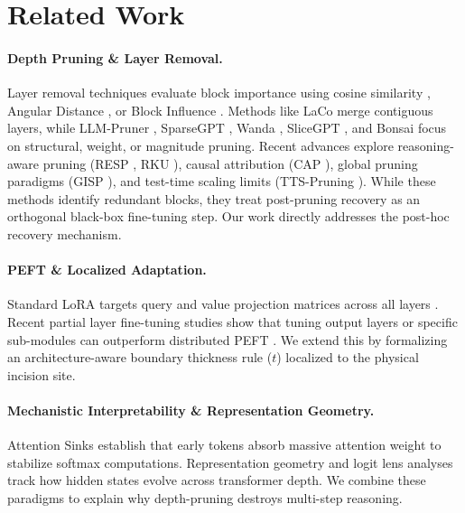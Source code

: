 \documentclass[11pt]{article}
\begin{document}
\section{Related Work}

\paragraph{Depth Pruning \& Layer Removal.} 
Layer removal techniques evaluate block importance using cosine similarity \citep{gromov2024unreasonable}, Angular Distance \citep{siddiqui2024deeper}, or Block Influence \citep{men-etal-2025-shortgpt}. Methods like LaCo \citep{yang-etal-2024-laco} merge contiguous layers, while LLM-Pruner \citep{ma2023llmpruner}, SparseGPT \citep{frantar2023sparsegpt}, Wanda \citep{sun2024wanda}, SliceGPT \citep{ashkboos2024slicegpt}, and Bonsai \citep{kolawole2024bonsai} focus on structural, weight, or magnitude pruning. Recent advances explore reasoning-aware pruning (RESP \citep{wang2025resp}, RKU \citep{qian2026rku}), causal attribution (CAP \citep{sheth2026cap}), global pruning paradigms (GISP \citep{wang2026gisp}), and test-time scaling limits (TTS-Pruning \citep{monjur2026ttspruning}). While these methods identify redundant blocks, they treat post-pruning recovery as an orthogonal black-box fine-tuning step. Our work directly addresses the post-hoc recovery mechanism.

\paragraph{PEFT \& Localized Adaptation.} 
Standard LoRA targets query and value projection matrices across all layers \citep{hu2022lora}. Recent partial layer fine-tuning studies show that tuning output layers or specific sub-modules can outperform distributed PEFT \citep{yaolu2026reassessing}. We extend this by formalizing an architecture-aware boundary thickness rule ($t$) localized to the physical incision site.

\paragraph{Mechanistic Interpretability \& Representation Geometry.}
Attention Sinks \citep{xiao2023efficient} establish that early tokens absorb massive attention weight to stabilize softmax computations. Representation geometry and logit lens analyses \citep{nostalgebraist2021lens} track how hidden states evolve across transformer depth. We combine these paradigms to explain why depth-pruning destroys multi-step reasoning.
\end{document}
